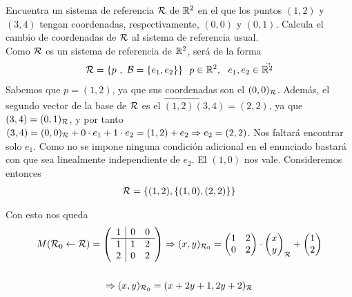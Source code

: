 \documentclass[12pt]{article}
\begin{document}
    \begin{ejercicio}[3 puntos]
        Encuentra un sistema de referencia $\mathcal{R}$ de $\mathbb{R}^2$ en el que los puntos $(1,2)$ y $(3,4)$ tengan coordenadas, respectivamente, $(0,0)$ y $(0,1)$. Calcula el cambio de coordenadas de $\mathcal{R}$ al sistema de referencia usual.\\

        Como $\mathcal{R}$ es un sistema de referencia de $\mathbb{R}^2$, será de la forma
        \begin{gather*}
            \cc{R}=\{p\ ,\ \cc{B}=\{e_1,e_2\}\}\ \ p \in \bb{R}^2,\ \ e_1,e_2 \in \vec{\bb{R}^2}
        \end{gather*}
        Sabemos que $p=(1,2)$, ya que sus coordenadas son el $(0,0)_{\mathcal{R}}$. Además, el segundo vector de la base de $\mathcal{R}$ es el $\vec{(1,2)(3,4)}=(2,2)$, ya que $(3,4)=(0,1)_{\mathcal{R}}$, y por tanto $(3,4)=(0,0)_{\mathcal{R}} + 0 \cdot e_1 + 1\cdot e_2 = (1,2)+e_2 \Rightarrow e_2 = (2,2)$. Nos faltará encontrar solo $e_1$. Como no se impone ninguna condición adicional en el enunciado bastará con que sea linealmente independiente de $e_2$. El $(1,0)$ nos vale. Consideremos entonces
        \begin{gather*}
            \mathcal{R}=\{(1,2),\{(1,0),(2,2)\}\}
        \end{gather*}

        Con esto nos queda
        \begin{gather*}
            M(\mathcal{R}_0 \leftarrow \mathcal{R})=\left(
            \begin{array}{r|rr}
                1 & 0 & 0\\
                \hline
                1 & 1 & 2\\
                2 & 0 & 2
            \end{array}\right) \Rightarrow (x,y)_{\mathcal{R}_0}=
            \begin{pmatrix}
                1&2\\
                0&2
            \end{pmatrix} \cdot
            \begin{pmatrix}
                x\\y
            \end{pmatrix}_{\mathcal{R}} + 
            \begin{pmatrix}
                1\\2
            \end{pmatrix}\\\\
            \Rightarrow (x,y)_{\mathcal{R}_0}=(x+2y+1,2y+2)_{\mathcal{R}}
        \end{gather*}

    \end{ejercicio}
    
\end{document}
